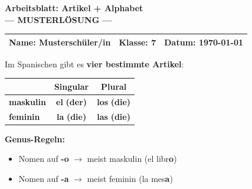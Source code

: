 \documentclass[11pt, a4paper]{article}
\newcommand{\fachfarbe}{spanisch}
\newcommand{\thema}{Artikel + Alphabet}
\newcommand{\klasse}{7}
\newcommand{\datum}{\today}
\newcommand{\lsg}[1]{\textcolor{loesung}{\textbf{#1}}}
\newcommand{\es}[1]{\textcolor{\fachfarbe}{\textbf{#1}}}
\begin{document}

\begin{center}
    {\Large\bfseries\textcolor{\fachfarbe}{Arbeitsblatt: \thema}}\\[0.3em]
    {\large\textcolor{loesung}{\textbf{--- MUSTERLÖSUNG ---}}}
\end{center}

\vspace{5pt}

\noindent
\begin{tabularx}{\textwidth}{|X|X|X|}
\hline
\textbf{Name:} \lsg{Musterschüler/in} &
\textbf{Klasse:} \klasse &
\textbf{Datum:} \datum \\
\hline
\end{tabularx}

\vspace{15pt}


\begin{merkkasten}
Im Spanischen gibt es \textbf{vier bestimmte Artikel}:

\vspace{0.5em}

\begin{center}
\begin{tabular}{|l|c|c|}
\hline
& \textbf{Singular} & \textbf{Plural} \\
\hline
\textbf{maskulin} & \es{el} \lsg{(der)} & \es{los} \lsg{(die)} \\
\hline
\textbf{feminin} & \es{la} \lsg{(die)} & \es{las} \lsg{(die)} \\
\hline
\end{tabular}
\end{center}

\vspace{0.5em}

\textbf{Genus-Regeln:}
\begin{itemize}[leftmargin=2em, itemsep=0pt]
    \item Nomen auf \textbf{-o} $\rightarrow$ meist maskulin (el libr\textbf{o})
    \item Nomen auf \textbf{-a} $\rightarrow$ meist feminin (la mes\textbf{a})
\end{itemize}
\end{merkkasten}
\end{document}

